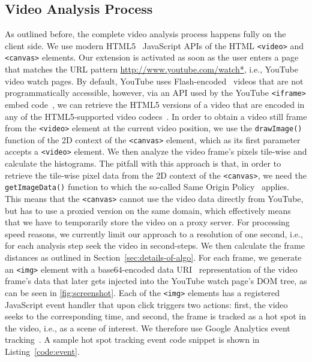 \documentclass[10pt,twocolumn,letterpaper]{article}
\begin{document}
\subsection{Video Analysis Process}
As outlined before, the complete video analysis process happens fully on the client side. We use modern HTML5~\cite{w3c_html5} JavaScript APIs of the HTML \texttt{<video>} and \texttt{<canvas>} elements. Our extension is activated as soon as the user enters a page that matches the URL pattern \url{http://www.youtube.com/watch*}, i.e., YouTube video watch pages. By default, YouTube uses Flash-encoded~\cite{flash} videos that are not programmatically accessible, however, via an API used by the YouTube \texttt{<iframe>} embed code~\cite{youtubeiframe}, we can retrieve the HTML5 versions of a video that are encoded in any of the HTML5-supported video codecs~\cite{html5video}. In order to obtain a video still frame from the \texttt{<video>} element at the current video position, we use the \texttt{drawImage()} function of the 2D context of the \texttt{<canvas>} element, which as its first parameter accepts a \texttt{<video>} element. We then analyze the video frame's pixels tile-wise and calculate the histograms. The pitfall with this approach is that, in order to retrieve the tile-wise pixel data from the 2D context of the \texttt{<canvas>}, we need the \texttt{getImageData()} function to which the so-called Same Origin Policy~\cite{sameoriginpolicy} applies. This means that the \texttt{<canvas>} cannot use the video data directly  from YouTube, but has to use a proxied version on the same domain, which effectively means that we have to temporarily store the video on a proxy server. For processing speed reasons, we currently limit our approach to a resolution of one second, i.e., for each analysis step seek the video in second-steps. We then calculate the frame distances as outlined in Section~\ref{sec:details-of-algo}. For each frame, we generate an \texttt{<img>} element with a base64-encoded data URI~\cite{datauri} representation of the video frame's data that later gets injected into the YouTube watch page's DOM tree, as can be seen in \autoref{fig:screenshot}. Each of the \texttt{<img>} elements has a registered JavaScript event handler that upon click triggers two actions: first, the video seeks to the corresponding time, and second, the frame is tracked as a hot spot in the video, i.e., as a scene of interest. We therefore use Google Analytics event tracking~\cite{analyticsevent}. A sample hot spot tracking event code snippet is shown in Listing~\ref{code:event}.
\end{document}
